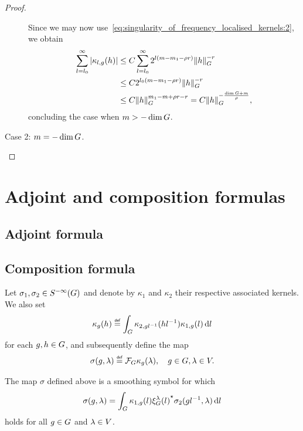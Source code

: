 \begin{proof}
\begin{description}
            Since we may now use~\eqref{eq:singularity_of_frequency_localised_kernels:2},
            we obtain
            \begin{align*}
                \sum_{l = l_0}^\infty \abs{\kappa_{l, g}(h)}
                &\leq C \sum_{l = l_0}^\infty 2^{l(m - m_1 - \rho r)} \norm [\Group] h^{-r}\\
                &\leq C 2^{l_0(m - m_1 - \rho r)} \norm [\Group] h^{-r}\\
                &\leq C \norm [\Group] h^{m_1 - m + \rho r - r} = C \norm [\Group] h^{-\frac{\dim \Group + m} \rho},
            \end{align*}
            concluding the case when $m > -\dim \Group$.
        \item[Case 2: $m = -\dim \Group$.]
    \end{description}
\end{proof}

\section{Adjoint and composition formulas}

\subsection{Adjoint formula}

\subsection{Composition formula}

\begin{lemma}
    Let $\sigma_1, \sigma_2 \in \SmoothingSymbols$
    and denote by $\kappa_1$ and $\kappa_2$ their respective associated kernels.
    We also set
    \begin{align*}
        \kappa_g(h) \defeq \int_\Group \kappa_{2, g l^{-1}}(h l^{-1}) \kappa_{1, g}(l) \dd l
    \end{align*}
    for each $g, h \in \Group$,
    and subsequently define the map
    \begin{align*}
        \sigma(g, \lambda) \defeq \Fourier \kappa_g(\lambda),
        \quad g \in \Group, \lambda \in \VectorSpace.
    \end{align*}

    The map $\sigma$ defined above is a smoothing symbol for which
    \begin{align*}
        \sigma(g, \lambda) = \int_\Group \kappa_{1, g}(l) \adj {\Rep \lambda(l)} \sigma_2(g l^{-1}, \lambda) \dd l
    \end{align*}
    holds for all $g \in \Group$ and $\lambda \in \VectorSpace$.
\end{lemma}

